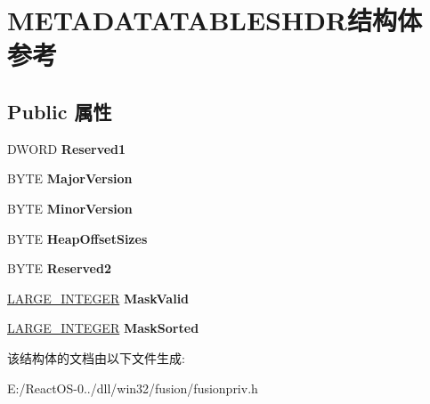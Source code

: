 \hypertarget{struct_m_e_t_a_d_a_t_a_t_a_b_l_e_s_h_d_r}{}\section{M\+E\+T\+A\+D\+A\+T\+A\+T\+A\+B\+L\+E\+S\+H\+D\+R结构体 参考}
\label{struct_m_e_t_a_d_a_t_a_t_a_b_l_e_s_h_d_r}
\subsection*{Public 属性}
\begin{DoxyCompactItemize}
\item 
\mbox{\label{struct_m_e_t_a_d_a_t_a_t_a_b_l_e_s_h_d_r_a387637e0cb37561954d91d56d7e73c4f}} 
D\+W\+O\+RD {\bfseries Reserved1}
\item 
\mbox{\label{struct_m_e_t_a_d_a_t_a_t_a_b_l_e_s_h_d_r_a1c7337a32c7a2b816db413bd52b5ba87}} 
B\+Y\+TE {\bfseries Major\+Version}
\item 
\mbox{\label{struct_m_e_t_a_d_a_t_a_t_a_b_l_e_s_h_d_r_a927fc38fa4400c6024141f8d23de3e8d}} 
B\+Y\+TE {\bfseries Minor\+Version}
\item 
\mbox{\label{struct_m_e_t_a_d_a_t_a_t_a_b_l_e_s_h_d_r_a55c7e39636675b3cee3c8819eef82338}} 
B\+Y\+TE {\bfseries Heap\+Offset\+Sizes}
\item 
\mbox{\label{struct_m_e_t_a_d_a_t_a_t_a_b_l_e_s_h_d_r_a6741491bfcd127aa353fd10c7562f519}} 
B\+Y\+TE {\bfseries Reserved2}
\item 
\mbox{\label{struct_m_e_t_a_d_a_t_a_t_a_b_l_e_s_h_d_r_aecc474c408cfb24aa4c5aec73847af98}} 
\hyperlink{union___l_a_r_g_e___i_n_t_e_g_e_r}{L\+A\+R\+G\+E\+\_\+\+I\+N\+T\+E\+G\+ER} {\bfseries Mask\+Valid}
\item 
\mbox{\label{struct_m_e_t_a_d_a_t_a_t_a_b_l_e_s_h_d_r_a41949141beb3e35ff019c261d3152a93}} 
\hyperlink{union___l_a_r_g_e___i_n_t_e_g_e_r}{L\+A\+R\+G\+E\+\_\+\+I\+N\+T\+E\+G\+ER} {\bfseries Mask\+Sorted}
\end{DoxyCompactItemize}


该结构体的文档由以下文件生成\+:\begin{DoxyCompactItemize}
\item 
E\+:/\+React\+O\+S-\/0../dll/win32/fusion/fusionpriv.\+h\end{DoxyCompactItemize}
